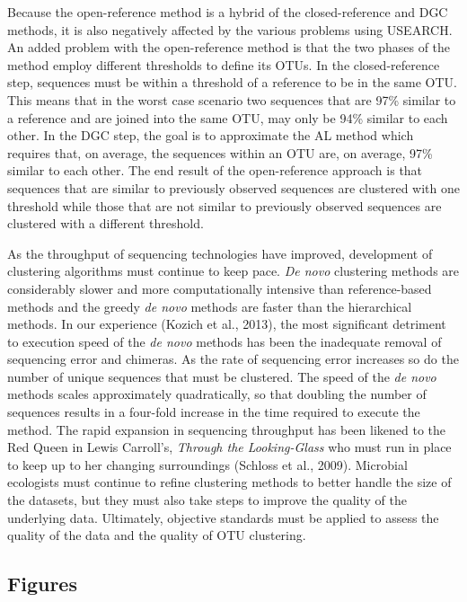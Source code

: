 \documentclass[11pt,]{article}
\begin{document}
Because the open-reference method is a hybrid of the closed-reference
and DGC methods, it is also negatively affected by the various problems
using USEARCH. An added problem with the open-reference method is that
the two phases of the method employ different thresholds to define its
OTUs. In the closed-reference step, sequences must be within a threshold
of a reference to be in the same OTU. This means that in the worst case
scenario two sequences that are 97\% similar to a reference and are
joined into the same OTU, may only be 94\% similar to each other. In the
DGC step, the goal is to approximate the AL method which requires that,
on average, the sequences within an OTU are, on average, 97\% similar to
each other. The end result of the open-reference approach is that
sequences that are similar to previously observed sequences are
clustered with one threshold while those that are not similar to
previously observed sequences are clustered with a different threshold.

As the throughput of sequencing technologies have improved, development
of clustering algorithms must continue to keep pace. \emph{De novo}
clustering methods are considerably slower and more computationally
intensive than reference-based methods and the greedy \emph{de novo}
methods are faster than the hierarchical methods. In our experience
(Kozich et al., 2013), the most significant detriment to execution speed
of the \emph{de novo} methods has been the inadequate removal of
sequencing error and chimeras. As the rate of sequencing error increases
so do the number of unique sequences that must be clustered. The speed
of the \emph{de novo} methods scales approximately quadratically, so
that doubling the number of sequences results in a four-fold increase in
the time required to execute the method. The rapid expansion in
sequencing throughput has been likened to the Red Queen in Lewis
Carroll's, \emph{Through the Looking-Glass} who must run in place to
keep up to her changing surroundings (Schloss et al., 2009). Microbial
ecologists must continue to refine clustering methods to better handle
the size of the datasets, but they must also take steps to improve the
quality of the underlying data. Ultimately, objective standards must be
applied to assess the quality of the data and the quality of OTU
clustering.

\newpage

\subsection{Figures}\label{figures}
\end{document}
